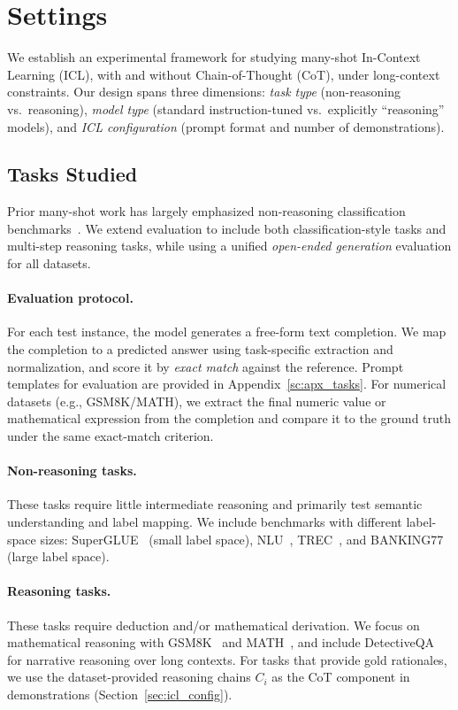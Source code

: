 \section{Settings}
We establish an experimental framework for studying many-shot In-Context Learning (ICL), with and without Chain-of-Thought (CoT), under long-context constraints.
Our design spans three dimensions: \emph{task type} (non-reasoning vs.\ reasoning), \emph{model type} (standard instruction-tuned vs.\ explicitly ``reasoning'' models), and \emph{ICL configuration} (prompt format and number of demonstrations).



\subsection{Tasks Studied} 
Prior many-shot work has largely emphasized non-reasoning classification benchmarks~\cite{struggle, bertsch-etal-2025-context}.
We extend evaluation to include both classification-style tasks and multi-step reasoning tasks, while using a unified \emph{open-ended generation} evaluation for all datasets.


\paragraph{Evaluation protocol.}
For each test instance, the model generates a free-form text completion.
We map the completion to a predicted answer using task-specific extraction and normalization, and score it by \emph{exact match} against the reference. Prompt templates for evaluation are provided in Appendix~\ref{sc:apx_tasks}.
For numerical datasets (e.g., GSM8K/MATH), we extract the final numeric value or mathematical expression from the completion and compare it to the ground truth under the same exact-match criterion.


\paragraph{Non-reasoning tasks.}
These tasks require little intermediate reasoning and primarily test semantic understanding and label mapping.
We include benchmarks with different label-space sizes: SuperGLUE~\cite{superglue} (small label space), NLU~\cite{nlu}, TREC~\cite{trec}, and BANKING77~\cite{banking} (large label space).

\paragraph{Reasoning tasks.}
These tasks require deduction and/or mathematical derivation.
We focus on mathematical reasoning with GSM8K~\cite{cobbe2021gsm8k} and MATH~\cite{hendrycksmath2021}, and include DetectiveQA~\cite{xu2025detectiveqaevaluatinglongcontextreasoning} for narrative reasoning over long contexts.
For tasks that provide gold rationales, we use the dataset-provided reasoning chains $C_i$ as the CoT component in demonstrations (Section~\ref{sec:icl_config}).

